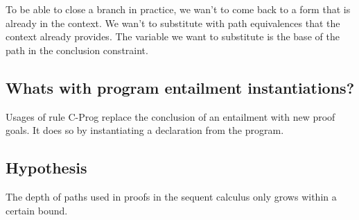 \documentclass[a4paper]{article}
\begin{document}
To be able to close a branch in practice, we wan't to come back to a form that is already in the context.
We wan't to substitute with path equivalences that the context already provides.
The variable we want to substitute is the base of the path in the conclusion constraint.

\subsection{Whats with program entailment instantiations?}
\begin{prooftree}
\end{prooftree}

Usages of rule C-Prog replace the conclusion of an entailment with new proof goals.
It does so by instantiating a declaration from the program.

\subsection{Hypothesis}
The depth of paths used in proofs in the sequent calculus only grows within a certain bound.
\end{document}
